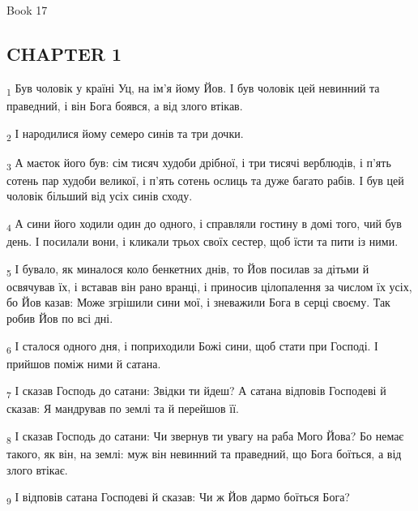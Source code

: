 Book 17
\subsection{CHAPTER 1}
\begin{tcolorbox}
\textsubscript{1} Був чоловік у країні Уц, на ім'я йому Йов. І був чоловік цей невинний та праведний, і він Бога боявся, а від злого втікав.
\end{tcolorbox}
\begin{tcolorbox}
\textsubscript{2} І народилися йому семеро синів та три дочки.
\end{tcolorbox}
\begin{tcolorbox}
\textsubscript{3} А маєток його був: сім тисяч худоби дрібної, і три тисячі верблюдів, і п'ять сотень пар худоби великої, і п'ять сотень ослиць та дуже багато рабів. І був цей чоловік більший від усіх синів сходу.
\end{tcolorbox}
\begin{tcolorbox}
\textsubscript{4} А сини його ходили один до одного, і справляли гостину в домі того, чий був день. І посилали вони, і кликали трьох своїх сестер, щоб їсти та пити із ними.
\end{tcolorbox}
\begin{tcolorbox}
\textsubscript{5} І бувало, як миналося коло бенкетних днів, то Йов посилав за дітьми й освячував їх, і вставав він рано вранці, і приносив цілопалення за числом їх усіх, бо Йов казав: Може згрішили сини мої, і зневажили Бога в серці своєму. Так робив Йов по всі дні.
\end{tcolorbox}
\begin{tcolorbox}
\textsubscript{6} І сталося одного дня, і поприходили Божі сини, щоб стати при Господі. І прийшов поміж ними й сатана.
\end{tcolorbox}
\begin{tcolorbox}
\textsubscript{7} І сказав Господь до сатани: Звідки ти йдеш? А сатана відповів Господеві й сказав: Я мандрував по землі та й перейшов її.
\end{tcolorbox}
\begin{tcolorbox}
\textsubscript{8} І сказав Господь до сатани: Чи звернув ти увагу на раба Мого Йова? Бо немає такого, як він, на землі: муж він невинний та праведний, що Бога боїться, а від злого втікає.
\end{tcolorbox}
\begin{tcolorbox}
\textsubscript{9} І відповів сатана Господеві й сказав: Чи ж Йов дармо боїться Бога?
\end{tcolorbox}
